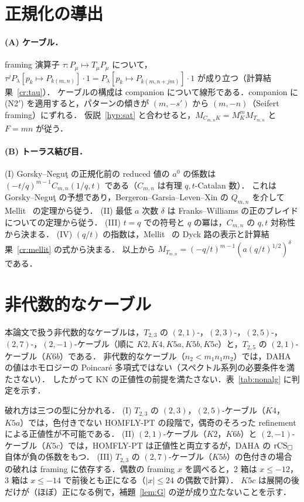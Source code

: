 \section{正規化の導出}\label{app:normalization}
\paragraph{(A) ケーブル．}
framing 演算子 $\tau:P_\mu\mapsto T_\mu P_\mu$ について，$\tau^jP_\lambda[p_k\mapsto P_{k(m,n)}]\cdot1=P_\lambda[p_k\mapsto P_{k(m,n+jm)}]\cdot1$ が成り立つ（計算結果~\ref{cr:tau}）．
ケーブルの構成は companion について線形である．companion に (N2$'$) を適用すると，パターンの傾きが $(m,-s')$ から $(m,-n)$（Seifert framing）にずれる．
仮説~\ref{hyp:sat} と合わせると，$M_{C_{m,n}K}=M_K^mM_{T_{m,n}}$ と $F=mn$ が従う．
\paragraph{(B) トーラス結び目．}
(I) Gorsky--Neguţ の正規化前の reduced 値の $a^0$ の係数は $(-t/q)^{m-1}C_{m,n}(1/q,t)$ である（$C_{m,n}$ は有理 $q,t$-Catalan 数）．
これは Gorsky--Neguţ の予想であり，Bergeron--Garsia--Leven--Xin の $Q_{m,n}$ を介して Mellit~\cite{Mellit16} の定理から従う．
(II) 最低 $a$ 次数 $\delta$ は Franks--Williams の正のブレイドについての定理から従う．
(III) $t=q$ での符号と $q$ の冪は，$C_{m,n}$ の $q,t$ 対称性から決まる．
(IV) $(q/t)$ の指数は，Mellit~\cite{Mellit17} の Dyck 路の表示と計算結果~\ref{cr:mellit} の式から決まる．
以上から $M_{T_{m,n}}=(-q/t)^{m-1}(a(q/t)^{1/2})^{\delta}$ である．

\section{非代数的なケーブル}\label{app:nonalg}
本論文で扱う非代数的なケーブルは，$T_{2,3}$ の $(2,1)$-，$(2,3)$-，$(2,5)$-，$(2,7)$-，$(2,-1)$-ケーブル（順に $K2,K4,K5a,K5b,K5c$）と，$T_{2,5}$ の $(2,1)$-ケーブル（$K6b$）である．
非代数的なケーブル（$n_2<m_1n_1m_2$）では，DAHA の値はホモロジーの Poincaré 多項式ではない（スペクトル系列の必要条件を満たさない）．
したがって KN の正値性の前提を満たさない．表~\ref{tab:nonalg} に判定を示す．
\begin{table}[h]
\centering
\caption{非代数的なケーブルの判定（framing 0）．各欄は「spin 表示の負の項の数/項数; genus 表示の負の項の数/項数」（全体の符号はそれぞれで良い方）．}\label{tab:nonalg}
\resizebox{\textwidth}{!}{}
\end{table}
破れ方は三つの型に分かれる．
(I) $T_{2,3}$ の $(2,3)$，$(2,5)$-ケーブル（$K4$，$K5a$）では，色付きでない HOMFLY-PT の段階で，偶奇のそろった refinement による正値性が不可能である．
(II) $(2,1)$-ケーブル（$K2$，$K6b$）と $(2,-1)$-ケーブル（$K5c$）では，HOMFLY-PT は正値性と両立するが，DAHA の $\textrm{rCS}_\square$ 自体が負の係数をもつ．
(III) $T_{2,3}$ の $(2,7)$-ケーブル（$K5b$）の色付きの場合の破れは framing に依存する．偶数の framing $x$ を調べると，2 箱は $x\le-12$，3 箱は $x\le-14$ で前後とも正になる（$|x|\le24$ の偶数で計算）．
$K5c$ は展開の後だけが（ほぼ）正になる例で，補題~\ref{lem:G} の逆が成り立たないことを示す．

